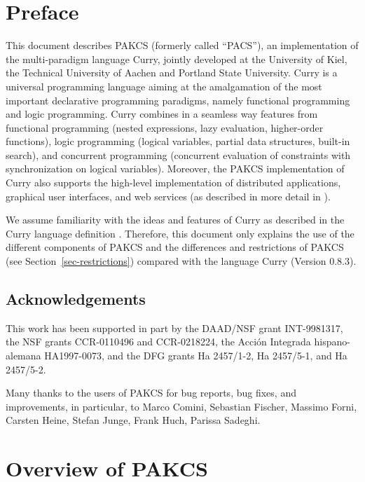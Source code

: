\documentclass[11pt,fleqn]{article}
\begin{document}
\newpage

\section*{Preface}

This document describes PAKCS (formerly called ``PACS''),
an implementation of the multi-paradigm language Curry,
jointly developed at the University of Kiel, the Technical University
of Aachen and Portland State University.
Curry is a universal programming language aiming at the amalgamation
of the most important declarative programming paradigms,
namely functional programming and logic programming.  
Curry combines in a seamless way features from functional programming
(nested expressions, lazy evaluation, higher-order functions),
logic programming (logical variables, partial data structures,
built-in search), and concurrent programming (concurrent evaluation
of constraints with synchronization on logical variables).
Moreover, the PAKCS implementation of Curry also supports
the high-level implementation of distributed applications,
graphical user interfaces, and web services
(as described in more detail in \cite{Hanus99PPDP,Hanus00PADL,Hanus01PADL}).

We assume familiarity with the ideas and features
of Curry as described in the Curry language definition \cite{Hanus12Curry}.
Therefore, this document only explains the use of the different
components of PAKCS
and the differences and restrictions of PAKCS
(see Section~\ref{sec-restrictions})
compared with the language Curry (Version 0.8.3).


\bigskip

\subsection*{Acknowledgements}

This work has been supported in part by the DAAD/NSF grant INT-9981317,
the NSF grants CCR-0110496 and CCR-0218224,
the Acci\'on Integrada hispano-alemana HA1997-0073,
and the DFG grants Ha 2457/1-2, Ha 2457/5-1, and Ha 2457/5-2.

Many thanks to the users of PAKCS for bug reports, bug fixes, and improvements,
in particular, to Marco Comini, Sebastian Fischer, Massimo Forni,
Carsten Heine, Stefan Junge, Frank Huch, Parissa Sadeghi.


\newpage

\section{Overview of PAKCS}
\end{document}
